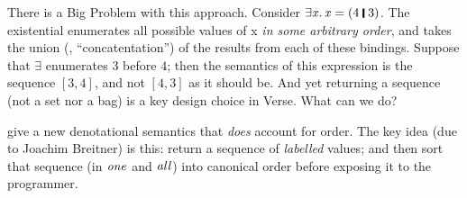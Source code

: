 There is a Big Problem with this approach.  Consider \ensuremath{\exists\Varid{x}.\,\Varid{x}\mathrel{=}(\mathrm{4}\;\rule[-0.1em]{0.15em}{0.75em}\;\mathrm{3})}.  The existential
enumerates all possible values of x \emph{in some arbitrary order}, and takes the union (\ie, ``concatentation'')
of the results from each of these bindings.  Suppose that \ensuremath{\exists{}} enumerates \ensuremath{\mathrm{3}} before \ensuremath{\mathrm{4}}; then
the semantics of this expression is the sequence $[3,4]$, and not $[4,3]$ as it should be.
And yet returning a sequence (not a set nor a bag) is a key design choice in Verse.  What can we do?

 give a new denotational semantics that \emph{does} account for order.
The key idea (due to Joachim Breitner) is this: return a sequence of \emph{labelled} values;
and then sort that sequence (in $\mathit{one}$ and $\mathit{all}$) into canonical order
before exposing it to the programmer.

